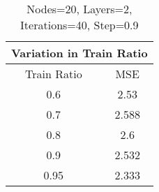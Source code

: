 \documentclass[a4paper,11pt]{article}
\begin{document}
\begin{table}
\centering
\begin{tabular}{|c|c|}
\hline 
\multicolumn{2}{|c|}{Variation in Train Ratio}\\ 
\hline
Train Ratio & MSE\\ 
\hline
0.6 & 2.53\\ 
\hline
0.7 & 2.588\\ 
\hline
0.8 & 2.6\\ 
\hline
0.9 & 2.532\\ 
\hline
0.95 & 2.333\\ 
\hline
\hline\end{tabular}
\label{table:table}
\caption{\small{Nodes=20, Layers=2, Iterations=40, Step=0.9}} 
\end{table}
\end{document}
